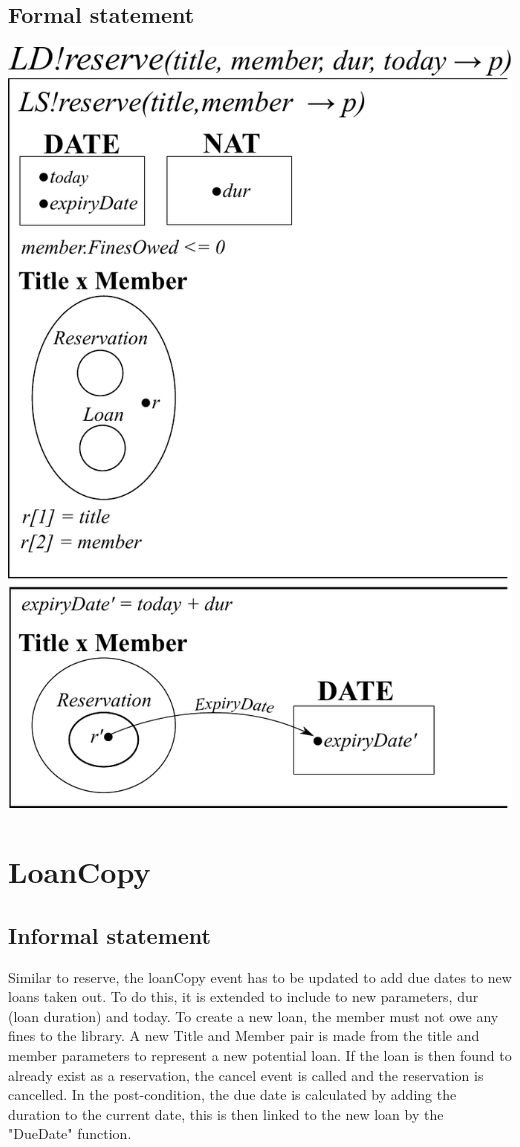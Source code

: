 \documentclass[]{report}
\begin{document}
\subsection{Formal statement}
\begin{center}
	\includegraphics[scale=0.75]{reserve.pdf}
\end{center}
\newpage
\section{LoanCopy}
\subsection{Informal statement}
Similar to reserve, the loanCopy event has to be updated to add due dates to new loans taken out. To do this, it is extended to include to new parameters, dur (loan duration) and today. To create a new loan, the member must not owe any fines to the library. A new Title and Member pair is made from the title and member parameters to represent a new potential loan. If the loan is then found to already exist as a reservation, the cancel event is called and the reservation is cancelled. In the post-condition, the due date is calculated by adding the duration to the current date, this is then linked to the new loan by the "DueDate" function.
\end{document}
